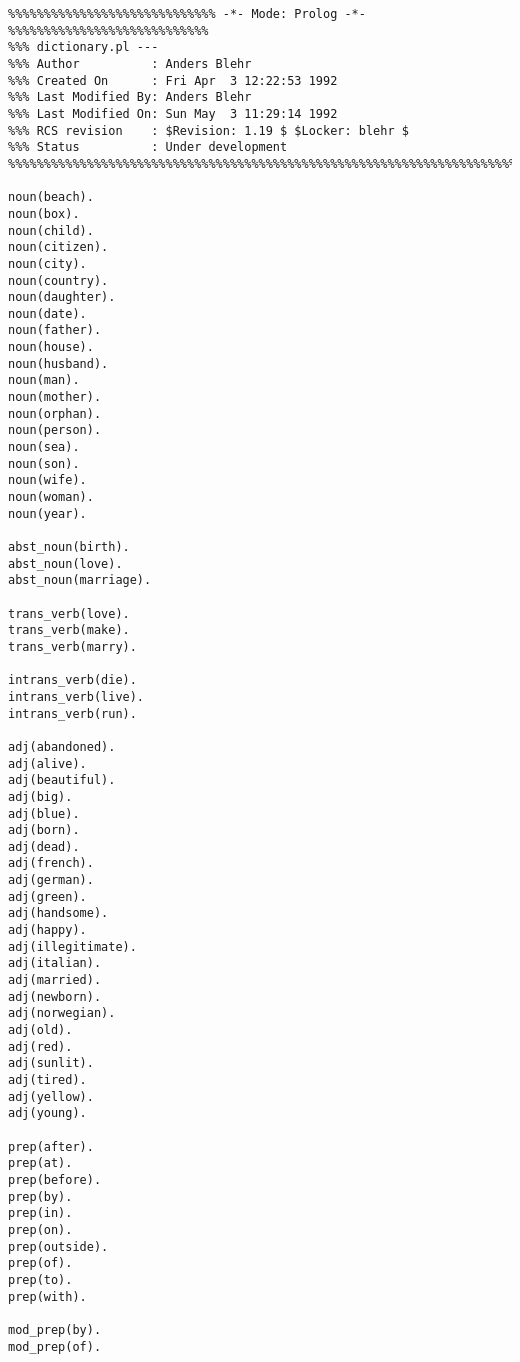 \begin{verbatim}
%%%%%%%%%%%%%%%%%%%%%%%%%%%%% -*- Mode: Prolog -*- %%%%%%%%%%%%%%%%%%%%%%%%%%%%
%%% dictionary.pl --- 
%%% Author          : Anders Blehr
%%% Created On      : Fri Apr  3 12:22:53 1992
%%% Last Modified By: Anders Blehr
%%% Last Modified On: Sun May  3 11:29:14 1992
%%% RCS revision    : $Revision: 1.19 $ $Locker: blehr $
%%% Status          : Under development
%%%%%%%%%%%%%%%%%%%%%%%%%%%%%%%%%%%%%%%%%%%%%%%%%%%%%%%%%%%%%%%%%%%%%%%%%%%%%%

noun(beach).
noun(box).
noun(child).
noun(citizen).
noun(city).
noun(country).
noun(daughter).
noun(date).
noun(father).
noun(house).
noun(husband).
noun(man).
noun(mother).
noun(orphan).
noun(person).
noun(sea).
noun(son).
noun(wife).
noun(woman).
noun(year).

abst_noun(birth).
abst_noun(love).
abst_noun(marriage).

trans_verb(love).
trans_verb(make).
trans_verb(marry).

intrans_verb(die).
intrans_verb(live).
intrans_verb(run).

adj(abandoned).
adj(alive).
adj(beautiful).
adj(big).
adj(blue).
adj(born).
adj(dead).
adj(french).
adj(german).
adj(green).
adj(handsome).
adj(happy).
adj(illegitimate).
adj(italian).
adj(married).
adj(newborn).
adj(norwegian).
adj(old).
adj(red).
adj(sunlit).
adj(tired).
adj(yellow).
adj(young).

prep(after).
prep(at).
prep(before).
prep(by).
prep(in).
prep(on).
prep(outside).
prep(of).
prep(to).
prep(with).

mod_prep(by).
mod_prep(of).
\end{verbatim}
